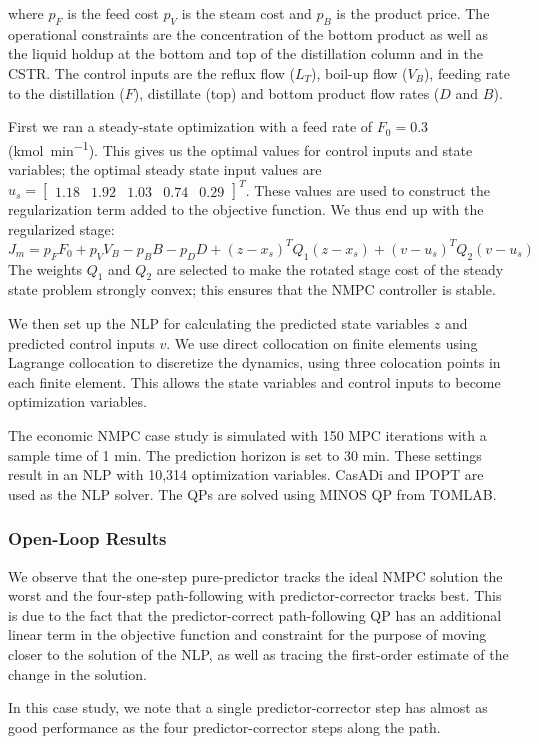 \documentclass{article}
\theoremstyle{example}
\theoremstyle{definition}
\theoremstyle{assumption}
\theoremstyle{lemma}
\begin{document}
where $p_F$ is the feed cost $p_V$ is the steam cost and $p_B$ is the product price.
The operational constraints are the concentration of the bottom product as well as the liquid holdup at the bottom and top of the distillation column and in the CSTR.
The control inputs are the reflux flow ($L_T$), boil-up flow ($V_B$), feeding rate to the distillation ($F$), distillate (top) and bottom product flow rates ($D$ and $B$).
\par
First we ran a steady-state optimization with a feed rate of $F_0=0.3$(\si{\kilo\mole\per\minute}).
This gives us the optimal values for control inputs and state variables; the optimal steady state input values are $u_s=\begin{bmatrix} 1.18 & 1.92&1.03&0.74&0.29\end{bmatrix}^T$.
These values are used to construct the regularization term added to the objective function.
We thus end up with the regularized stage:
\begin{equation}
	J_m=p_FF_0+p_VV_B-p_BB-p_DD+(z-x_s)^TQ_1(z-x_s)+(v-u_s)^TQ_2(v-u_s)
\end{equation}
The weights $Q_1$ and $Q_2$ are selected to make the rotated stage cost of the steady state problem strongly convex; this ensures that the NMPC controller is stable.
\par
We then set up the NLP for calculating the predicted state variables $z$ and predicted control inputs $v$.
We use direct collocation on finite elements using Lagrange collocation to discretize the dynamics, using three colocation points in each finite element.
This allows the state variables and control inputs to become optimization variables.
\par
The economic NMPC case study is simulated with 150 MPC iterations with a sample time of 1 min.
The prediction horizon is set to 30 min.
These settings result in an NLP with 10,314 optimization variables.
CasADi and IPOPT are used as the NLP solver.
The QPs are solved using MINOS QP from TOMLAB.
\subsubsection{Open-Loop Results}
We observe that the one-step pure-predictor tracks the ideal NMPC solution the worst and the four-step path-following with predictor-corrector tracks best.
This is due to the fact that the predictor-correct path-following QP has an additional linear term in the objective function and constraint for the purpose of moving closer to the solution of the NLP, as well as tracing the first-order estimate of the change in the solution.
\par
In this case study, we note that a single predictor-corrector step has almost as good performance as the four predictor-corrector steps along the path.
\end{document}
